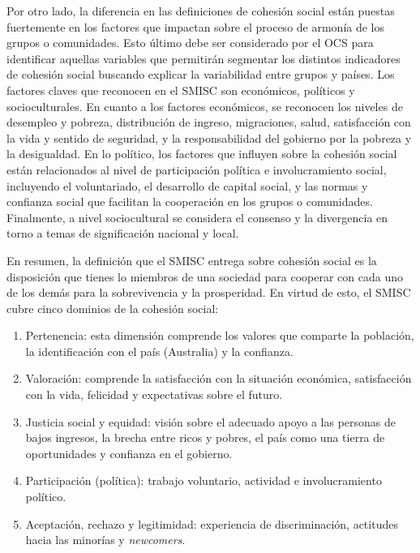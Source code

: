 \documentclass[
  12pt,
]{book}
\begin{document}
Por otro lado, la diferencia en las definiciones de cohesión social
están puestas fuertemente en los factores que impactan sobre el proceso
de armonía de los grupos o comunidades. Esto último debe ser considerado
por el OCS para identificar aquellas variables que permitirán segmentar
los distintos indicadores de cohesión social buscando explicar la
variabilidad entre grupos y países. Los factores claves que reconocen en
el SMISC son económicos, políticos y socioculturales. En cuanto a los
factores económicos, se reconocen los niveles de desempleo y pobreza,
distribución de ingreso, migraciones, salud, satisfacción con la vida y
sentido de seguridad, y la responsabilidad del gobierno por la pobreza y
la desigualdad. En lo político, los factores que influyen sobre la
cohesión social están relacionados al nivel de participación política e
involucramiento social, incluyendo el voluntariado, el desarrollo de
capital social, y las normas y confianza social que facilitan la
cooperación en los grupos o comunidades. Finalmente, a nivel
sociocultural se considera el consenso y la divergencia en torno a temas
de significación nacional y local.

En resumen, la definición que el SMISC entrega sobre cohesión social es
la disposición que tienes lo miembros de una sociedad para cooperar con
cada uno de los demás para la sobrevivencia y la prosperidad. En virtud
de esto, el SMISC cubre cinco dominios de la cohesión social:

\begin{enumerate}
\def\labelenumi{\arabic{enumi}.}
\item
  Pertenencia: esta dimensión comprende los valores que comparte la
  población, la identificación con el país (Australia) y la confianza.
\item
  Valoración: comprende la satisfacción con la situación económica,
  satisfacción con la vida, felicidad y expectativas sobre el futuro.
\item
  Justicia social y equidad: visión sobre el adecuado apoyo a las
  personas de bajos ingresos, la brecha entre ricos y pobres, el país
  como una tierra de oportunidades y confianza en el gobierno.
\item
  Participación (política): trabajo voluntario, actividad e
  involucramiento político.
\item
  Aceptación, rechazo y legitimidad: experiencia de discriminación,
  actitudes hacia las minorías y \emph{newcomers}.
\end{enumerate}
\end{document}
